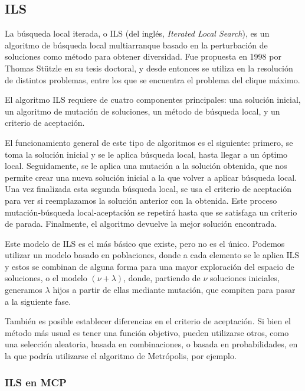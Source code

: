 \subsection{ILS}

La búsqueda local iterada, o ILS (del inglés, \textit{Iterated Local Search}), es un algoritmo de
búsqueda local multiarranque basado en la perturbación de soluciones como método para obtener diversidad.
Fue propuesta en 1998 por Thomas Stützle en su tesis doctoral, y desde entonces se utiliza en la resolución
de distintos problemas, entre los que se encuentra el problema del clique máximo.

El algoritmo ILS requiere de cuatro componentes principales: una solución inicial, un algoritmo de mutación de
soluciones, un método de búsqueda local, y un criterio de aceptación.

El funcionamiento general de este tipo de algoritmos es el siguiente: primero, se toma la solución inicial
y se le aplica búsqueda local, hasta llegar a un óptimo local. Seguidamente, se le aplica una mutación a la
solución obtenida, que nos permite crear una nueva solución inicial a la que volver a aplicar búsqueda local.
Una vez finalizada esta segunda búsqueda local, se usa el criterio de aceptación para ver si reemplazamos
la solución anterior con la obtenida. Este proceso mutación-búsqueda local-aceptación se repetirá hasta
que se satisfaga un criterio de parada. Finalmente, el algoritmo devuelve la mejor solución encontrada.

Este modelo de ILS es el más básico que existe, pero no es el único. Podemos utilizar un modelo basado en
poblaciones, donde a cada elemento se le aplica ILS y estos se combinan de alguna forma para una mayor exploración
del espacio de soluciones, o el modelo $(\nu + \lambda)$, donde, partiendo de $\nu$ soluciones iniciales,
generamos $\lambda$ hijos a partir de ellas mediante mutación, que compiten para pasar a la siguiente fase.

También es posible establecer diferencias en el criterio de aceptación. Si bien el método más usual es tener
una función objetivo, pueden utilizarse otros, como una selección aleatoria, basada en combinaciones,
o basada en probabilidades, en la que podría utilizarse el algoritmo de Metrópolis, por ejemplo.

\subsubsection{ILS en MCP}

